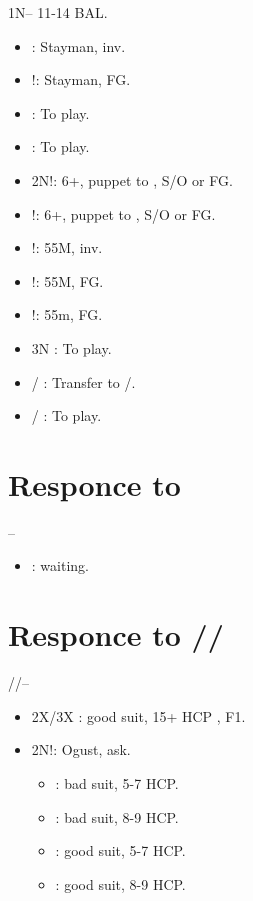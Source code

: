 \documentclass[12pt,twoside,a5paper]{report}%
\begin{document}
	1N-- 11-14 BAL.
	\begin{itemize}
	\renewcommand{\labelitemi}{}
	\item {} : Stayman, inv.
	\item {}!: Stayman, FG.
	\item {} : To play.
	\item {} : To play.
	\item 2N!: 6+\cl{}, puppet to , S/O or FG.
	\item {}!: 6+\di{}, puppet to , S/O or FG.
	\item {}!: 55M, inv.
	\item {}!: 55M, FG.
	\item {}!: 55m, FG.
	\item 3N : To play.
	\item {}/ : Transfer to /\sp{}.
	\item {}/ : To play.
	\end{itemize}

\chapter*{Responce to }
	--\\
	\begin{itemize}
	\item {} : waiting.
	\end{itemize}

\chapter*{Responce to /\he{}/\sp{}}
	//-- \\
	\begin{itemize}
	\renewcommand{\labelitemi}{}	
	\item 2X/3X : good suit, 15+ HCP , F1.
	\item 2N!: Ogust, ask.
		\begin{itemize}
		\renewcommand{\labelitemi}{--}
			\item {} : bad suit, 5-7 HCP.
			\item {} : bad suit, 8-9 HCP.
			\item {} : good suit, 5-7 HCP.
			\item {} : good suit, 8-9 HCP.
		\end{itemize}
	\end{itemize}
\end{document}
